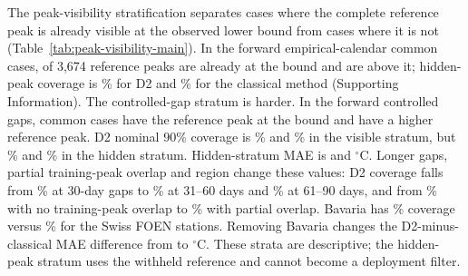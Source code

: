 The peak-visibility stratification separates cases where the complete reference peak is already visible at the observed lower bound from cases where it is not (Table~\ref{tab:peak-visibility-main}). In the forward empirical-calendar common cases, \CCCalendarVisibleN{} of 3,674 reference peaks are already at the bound and \CCCalendarHiddenN{} are above it; hidden-peak coverage is \CCCalendarHiddenDTwoCov\% for D2 and \CCCalendarHiddenStochCov\% for the classical method (Supporting Information). The controlled-gap stratum is harder. In the forward controlled gaps, \CCPeakVisibleN{} common cases have the reference peak at the bound and \CCPeakHiddenN{} have a higher reference peak. D2 nominal 90\% coverage is \CCPeakVisibleDTwoCov\% and \CCPeakVisibleStochCov\% in the visible stratum, but \CCPeakHiddenDTwoCov\% and \CCPeakHiddenStochCov\% in the hidden stratum. Hidden-stratum MAE is \CCPeakHiddenDTwoMAE{} and \CCPeakHiddenStochMAE{} $^{\circ}$C. Longer gaps, partial training-peak overlap and region change these values: D2 coverage falls from \CCGapThirtyCov\% at 30-day gaps to \CCGapSixtyCov\% at 31--60 days and \CCGapNinetyCov\% at 61--90 days, and from \CCOverlapNoneCov\% with no training-peak overlap to \CCOverlapPartialCov\% with partial overlap. Bavaria has \CCRegionBavariaCov\% coverage versus \CCRegionSwitzerlandCov\% for the Swiss FOEN stations. Removing Bavaria changes the D2-minus-classical MAE difference from \CCOverallMAEDiff{} to \CCLeaveBavariaMAEDiff{} $^{\circ}$C. These strata are descriptive; the hidden-peak stratum uses the withheld reference and cannot become a deployment filter.

